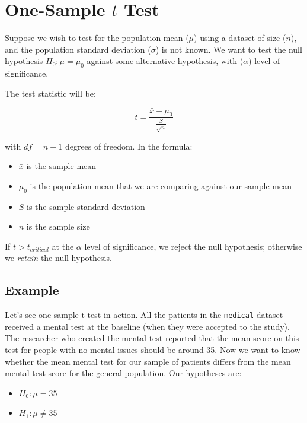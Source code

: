 \documentclass[]{book}
\providecommand{\tightlist}{%
  \setlength{\itemsep}{0pt}\setlength{\parskip}{0pt}}
\begin{document}
\hypertarget{one-sample-t-test}{%
\section{\texorpdfstring{One-Sample \(t\) Test}{One-Sample t Test}}\label{one-sample-t-test}}

Suppose we wish to test for the population mean (\(\mu\)) using a dataset of size (\(n\)), and the population standard deviation (\(\sigma\)) is not known. We want to test the null hypothesis \(H_0:\mu = \mu_0\) against some alternative hypothesis, with (\(\alpha\)) level of significance.

The test statistic will be:

\[t = \frac{\bar{x} - \mu_0}{\frac{S}{\sqrt{n}}}\]

with \(df = n - 1\) degrees of freedom. In the formula:

\begin{itemize}
\tightlist
\item
  \(\bar{x}\) is the sample mean
\item
  \(\mu_0\) is the population mean that we are comparing against our sample mean
\item
  \(S\) is the sample standard deviation
\item
  \(n\) is the sample size
\end{itemize}

If \(t > t_{critical}\) at the \(\alpha\) level of significance, we reject the null hypothesis; otherwise we \emph{retain} the null hypothesis.

\hypertarget{example}{%
\subsection{Example}\label{example}}

Let's see one-sample t-test in action. All the patients in the \texttt{medical} dataset received a mental test at the baseline (when they were accepted to the study). The researcher who created the mental test reported that the mean score on this test for people with no mental issues should be around 35. Now we want to know whether the mean mental test for our sample of patients differs from the mean mental test score for the general population. Our hypotheses are:

\begin{itemize}
\tightlist
\item
  \(H_0: \mu = 35\)
\item
  \(H_1: \mu \neq 35\)
\end{itemize}
\end{document}

